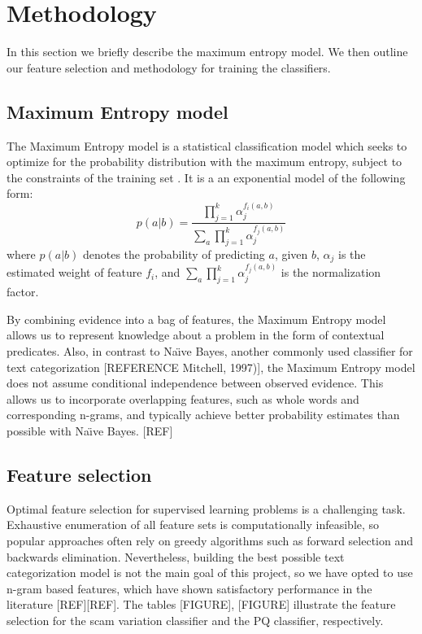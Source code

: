 \section{Methodology}
In this section we briefly describe the maximum entropy model. We then outline our feature selection and methodology for training the classifiers.
\subsection{Maximum Entropy model}
The Maximum Entropy model is a statistical classification model which seeks to optimize for the probability distribution with the maximum entropy, subject to the constraints of the training set . It is a an exponential model of the following form:
\begin{equation}
	p(a|b) = \frac{\prod_{j=1}^{k} \alpha_j^{f_i(a,b)}}{\sum_{a} \prod_{j=1}^{k} \alpha_j^{f_j(a,b)}}
\end{equation}
where $p(a|b)$ denotes the probability of predicting $a$, given $b$, $\alpha_{j}$ is the estimated weight of feature $f_{i}$, and $\sum_{a} \prod_{j=1}^{k} \alpha_j^{f_j(a,b)}$ is the normalization factor. 

By combining evidence into a bag of features, the Maximum Entropy model allows us to represent knowledge about a problem in the form of contextual predicates. Also, in contrast to Na\"{\i}ve Bayes, another commonly used classifier for text categorization [REFERENCE Mitchell, 1997)], the Maximum Entropy model does not assume conditional independence between observed evidence. This allows us to incorporate overlapping features, such as whole words and corresponding n-grams, and typically achieve better probability estimates than possible with Na\"{\i}ve Bayes. [REF]

\subsection{Feature selection}
Optimal feature selection for supervised learning problems is a challenging task. Exhaustive enumeration of all feature sets is computationally infeasible, so popular approaches often rely on greedy algorithms such as forward selection and backwards elimination. Nevertheless, building the best possible text categorization model is not the main goal of this project, so we have opted to use n-gram based features, which have shown satisfactory performance in the literature [REF][REF]. The tables [FIGURE], [FIGURE] illustrate the feature selection for the scam variation classifier and the PQ classifier, respectively.

